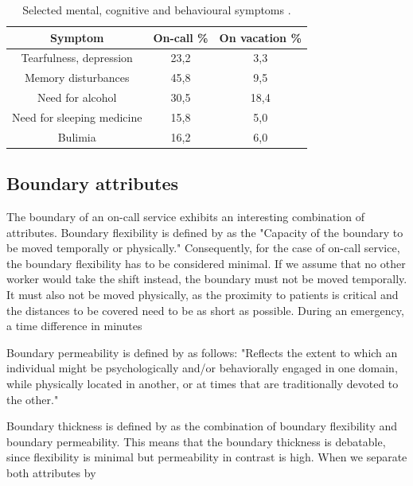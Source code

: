\documentclass{CML_Seminar_Template}
\begin{document}
\begin{table}
\begin{center}
\begin{tabular}{ |c|c|c|} 
 \hline
 Symptom & On-call \% & On vacation \% \\
 \hline
 Tearfulness, depression & 23,2 & 3,3 \\
 \hline
 Memory disturbances & 45,8 & 9,5 \\
 \hline
 Need for alcohol & 30,5 & 18,4 \\
 \hline
 Need for sleeping medicine & 15,8 & 5,0 \\
 \hline
 Bulimia & 16,2 & 6,0 \\
 \hline
\end{tabular}
\end{center}
    \caption{\label{CML_Seminar_Template_tab1} Selected mental, cognitive and behavioural symptoms \cite[]{Lindfors2006}. }
\end{table}

\subsection{Boundary attributes}
The boundary of an on-call service exhibits an interesting combination of attributes. Boundary flexibility is defined by \cite[]{Piszczek2014} as the "Capacity of the boundary to be moved temporally or physically." Consequently, for the case of on-call service, the boundary flexibility has to be considered minimal. If we assume that no other worker would take the shift instead, the boundary must not be moved temporally. It must also not be moved physically, as the proximity to patients is critical and the distances to be covered need to be as short as possible. During an emergency, a time difference in minutes 
\par
Boundary permeability is defined by \cite[]{Hecht2009} as follows: "Reflects the extent to which an individual might be psychologically and/or behaviorally engaged in one domain, while physically located in another, or at times that are traditionally devoted to the other."
\par
Boundary thickness is defined by \cite[]{Ashforth2000} as the combination of boundary flexibility and boundary permeability. This means that the boundary thickness is debatable, since flexibility is minimal but permeability in contrast is high. When we separate both attributes by  



\end{document}
